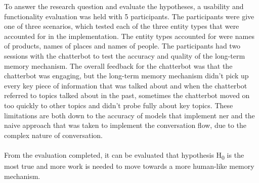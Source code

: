 To answer the research question and evaluate the hypotheses, a usability and functionality evaluation was held with 5 participants. The participants were give one of three scenarios, which tested each of the three entity types that were accounted for in the implementation. The entity types accounted for were names of products, names of places and names of people. The participants had two sessions with the chatterbot to test the accuracy and quality of the long-term memory mechanism. The overall feedback for the chatterbot was that the chatterbot was engaging, but the long-term memory mechanism didn't pick up every key piece of information that was talked about and when the chatterbot referred to topics talked about in the past, sometimes the chatterbot moved on too quickly to other topics and didn't probe fully about key topics. These limitations are both down to the accuracy of models that implement \gls{ner} and the naive approach that was taken to implement the conversation flow, due to the complex nature of conversation.\\\\
From the evaluation completed, it can be evaluated that hypothesis H\textsubscript{0} is the most true and more work is needed to move towards a more human-like memory mechanism.

